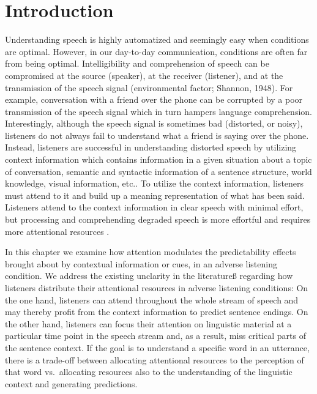\documentclass[a4paper, nobind]{templates/ociamthesis}
\begin{document}
\hypertarget{introduction}{%
\section{Introduction}\label{introduction}}

Understanding speech is highly automatized and seemingly easy when conditions are optimal.
However, in our day-to-day communication, conditions are often far from being optimal.
Intelligibility and comprehension of speech can be compromised at the source (speaker), at the receiver (listener), and at the transmission of the speech signal (environmental factor; Shannon, 1948).
For example, conversation with a friend over the phone can be corrupted by a poor transmission of the speech signal which in turn hampers language comprehension.
Interestingly, although the speech signal is sometimes bad (distorted, or noisy), listeners do not always fail to understand what a friend is saying over the phone.
Instead, listeners are successful in understanding distorted speech by utilizing context information which contains information in a given situation about a topic of conversation, semantic and syntactic information of a sentence structure, world knowledge, visual information, etc.\autocites{Kaiser2004,Knoeferle2005,Altmann2007,Xiang2015}[for reviews,][]{Stilp2020}.
To utilize the context information, listeners must attend to it and build up a meaning representation of what has been said.
Listeners attend to the context information in clear speech with minimal effort, but processing and comprehending degraded speech is more effortful and requires more attentional resources \autocite{Eckert2016,Peelle2018,Wild2012}.

In this chapter we examine how attention modulates the predictability effects brought about by contextual information or cues, in an adverse listening condition.
We address the existing unclarity in the literatureß regarding how listeners distribute their attentional resources in adverse listening conditions:
On the one hand, listeners can attend throughout the whole stream of speech and may thereby profit from the context information to predict sentence endings.
On the other hand, listeners can focus their attention on linguistic material at a particular time point in the speech stream and, as a result, miss critical parts of the sentence context.
If the goal is to understand a specific word in an utterance, there is a trade-off between allocating attentional resources to the perception of that word vs.~allocating resources also to the understanding of the linguistic context and generating predictions.
\end{document}
